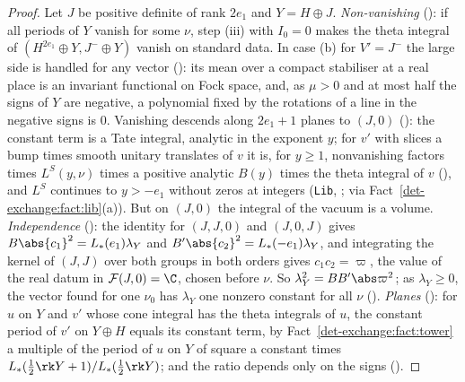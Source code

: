 \begin{proof}
Let $J$ be positive definite of rank $2e_1$ and $Y=H\oplus J$. \emph{Non-vanishing}
(): if all periods of $Y$ vanish for some
$\nu$, step (iii) with $I_0=0$ makes the theta integral of $(H^{2e_1}\oplus Y,J^-\oplus Y)$ vanish
on standard data. In case (b) for $V'=J^-$ the large side is handled for any vector
(): its mean over a compact stabiliser at a real
place is an invariant functional on Fock space, and, as $\mu>0$ and at most half the signs of $Y$
are negative, a polynomial fixed by the rotations of a line in the negative signs is $0$. Vanishing
descends along $2e_1+1$ planes to $(J,0)$ ():
the constant term is a Tate integral, analytic in the exponent $y$; for $v'$ with slices a bump times
smooth unitary translates of $v$ it is, for $y\ge1$, nonvanishing factors times $L^S(y,\nu)$
times a positive analytic $B(y)$ times the theta integral of $v$
(), and $L^S$ continues to $y>-e_1$ without zeros at
integers (\texttt{Lib},
; via
Fact~\ref{det-exchange:fact:lib}(a)). But on $(J,0)$ the integral of the vacuum is a volume. \emph{Independence}
(): the identity for $(J,J,0)$ and $(J,0,J)$
gives $B\abs{c_1}^2=L_*(e_1)\lambda_Y$ and $B'\abs{c_2}^2=L_*(-e_1)\lambda_Y$, and integrating the
kernel of $(J,J)$ over both groups in both orders gives $c_1c_2=\varpi$, the value of the real datum
in $\mathcal F(J,0)=\C$, chosen before $\nu$. So $\lambda_Y^2=BB'\abs\varpi^2$; as $\lambda_Y\ge0$,
the vector found for one $\nu_0$ has $\lambda_Y$ one nonzero constant for all $\nu$
().
\emph{Planes} (): for $u$ on $Y$ and $v'$
whose cone integral has the theta integrals of $u$, the constant period of $v'$ on $Y\oplus H$ equals
its constant term, by
Fact~\ref{det-exchange:fact:tower} a multiple of the period of $u$ on $Y$ of
square a constant times $L_*(\frac12\rk Y+1)/L_*(\frac12\rk Y)$; and the ratio depends only on the
signs ().
\end{proof}

